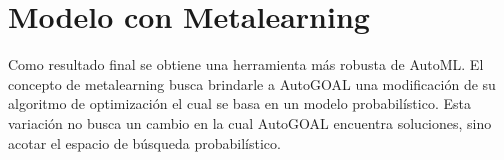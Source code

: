
\section{Modelo con Metalearning}

Como resultado final se obtiene una herramienta más robusta de AutoML. El
concepto de metalearning busca brindarle a AutoGOAL una modificación de su
algoritmo de optimización el cual se basa en un modelo probabilístico. Esta
variación no busca un cambio en la cual AutoGOAL encuentra soluciones, sino
acotar el espacio de búsqueda probabilístico.
